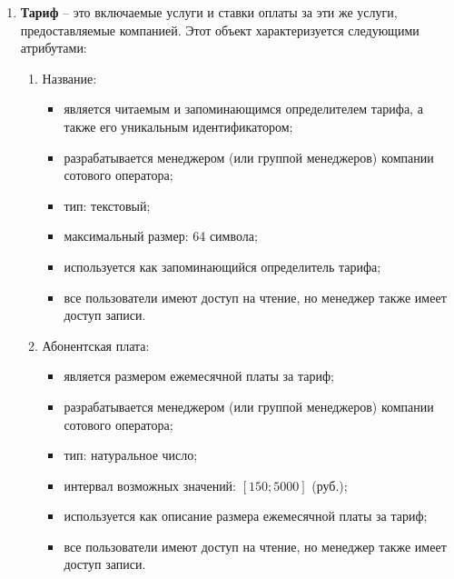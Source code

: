 \begin{enumerate}
    \item \textbf{Тариф} -- это включаемые услуги и ставки оплаты за эти же услуги, предоставляемые компанией. Этот объект характеризуется следующими атрибутами:
    \begin{enumerate}
        \item Название:
        \begin{itemize}
            \item является читаемым и запоминающимся определителем тарифа, а также его уникальным идентификатором;
            \item разрабатывается менеджером (или группой менеджеров) компании сотового оператора;
            \item тип: текстовый;
            \item максимальный размер: 64 символа;
            \item используется как запоминающийся определитель тарифа;
            \item все пользователи имеют доступ на чтение, но менеджер также имеет доступ записи.
        \end{itemize}

        \item Абонентская плата:
        \begin{itemize}
            \item является размером ежемесячной платы за тариф;
            \item разрабатывается менеджером (или группой менеджеров) компании сотового оператора;
            \item тип: натуральное число;
            \item интервал возможных значений: $[150; 5000]$ (руб.); %
            \item используется как описание размера ежемесячной платы за тариф;
            \item все пользователи имеют доступ на чтение, но менеджер также имеет доступ записи.
        \end{itemize}


\end{enumerate}
\end{enumerate}
